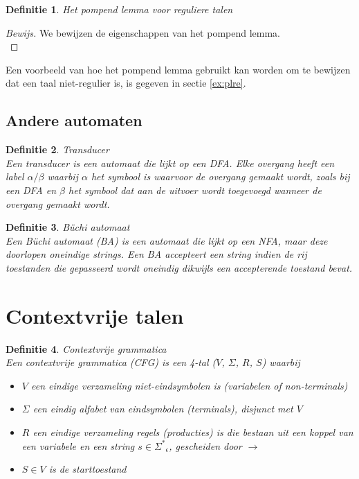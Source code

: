 \documentclass[a4paper]{article}
\newtheorem{tdefinitie}{Definitie}[section]
\newenvironment{definitie}[1]%
  {\begin{mdframed}[backgroundcolor=silver,
    topline=false,
    rightline=false,
    leftline=false,
    bottomline=false]\begin{tdefinitie}#1\\\normalfont}%
  {\end{tdefinitie}\end{mdframed}}
\newenvironment{bewijs}[1]%
  {\begin{mdframed}[topline=true,
    rightline=true,
    leftline=true,
    bottomline=true]\begin{proof}[Bewijs]#1\\[.2cm]\normalfont}%
  {\end{proof}\end{mdframed}}
\newcommand{\sstar}{\ensuremath{\Sigma^*}}
\begin{document}
\begin{definitie}{Het pompend lemma voor reguliere talen}
  
\end{definitie}

\begin{bewijs}{We bewijzen de eigenschappen van het pompend lemma.}
  
\end{bewijs}

Een voorbeeld van hoe het pompend lemma gebruikt kan worden om te bewijzen dat een taal niet-regulier is, is gegeven in sectie \ref{ex:plre}.


\subsection{Andere automaten}

\begin{definitie}{Transducer}
  Een transducer is een automaat die lijkt op een DFA. Elke overgang heeft een label $\alpha/\beta$ waarbij $\alpha$ het symbool is waarvoor de overgang gemaakt wordt, zoals bij een DFA en $\beta$ het symbool dat aan de uitvoer wordt toegevoegd wanneer de overgang gemaakt wordt.
\end{definitie}

\begin{definitie}{B\"uchi automaat}
  Een B\"uchi automaat (BA) is een automaat die lijkt op een NFA, maar deze doorlopen oneindige strings. Een BA accepteert een string indien de rij toestanden die gepasseerd wordt oneindig dikwijls een accepterende toestand bevat.
\end{definitie}

\newpage\section{Contextvrije talen}

\begin{definitie}{Contextvrije grammatica}
  Een contextvrije grammatica (CFG) is een 4-tal ($V$, $\Sigma$, $R$, $S$) waarbij
  \begin{itemize}
  \item $V$ een eindige verzameling niet-eindsymbolen is (variabelen of non-terminals)
  \item $\Sigma$ een eindig alfabet van eindsymbolen (terminals), disjunct met $V$
  \item $R$ een eindige verzameling regels (producties) is die bestaan uit een koppel van een variabele en een string $s \in \sstar_\epsilon$, gescheiden door $\rightarrow$
  \item $S \in V$ is de starttoestand
  \end{itemize}
\end{definitie}
\end{document}
